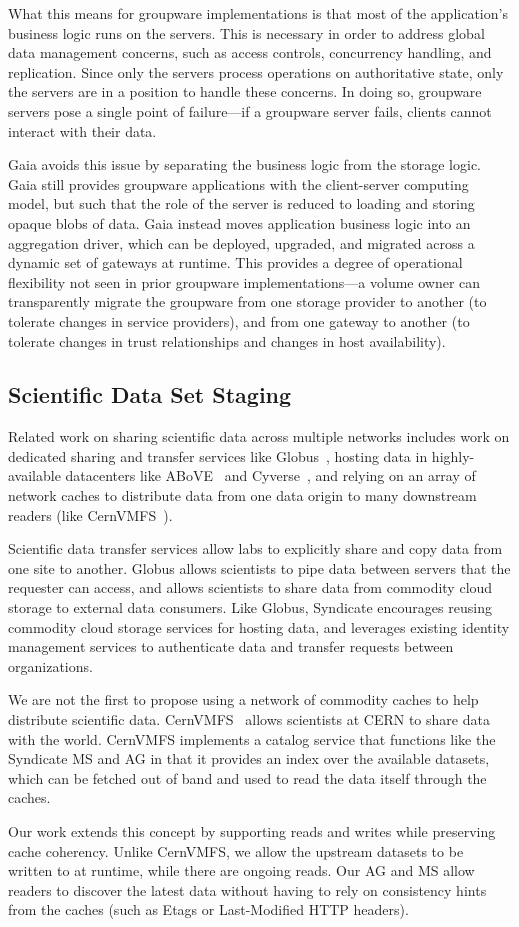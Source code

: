 What this means for groupware implementations is that most of the application's business logic runs on the
servers.  This is necessary in order to address global data management
concerns, such as access controls, concurrency handling, and
replication.  Since only the servers process operations on authoritative state, only
the servers are in a position to handle these concerns.  In doing so, groupware
servers pose a single point of failure---if a groupware server fails, clients
cannot interact with their data.

Gaia avoids this issue by separating the business logic from the storage logic.
Gaia still provides groupware applications with the client-server computing model,
but such that the role of the server is reduced to loading
and storing opaque blobs of data.  Gaia instead
moves application business logic into an aggregation driver, which can be
deployed, upgraded, and migrated across a dynamic set of gateways at runtime.
This provides a degree of operational flexibility not seen in prior groupware
implementations---a volume owner can transparently migrate the groupware from
one storage provider to another (to tolerate changes in service providers),
and from one gateway to another (to tolerate changes in trust relationships and
changes in host availability).

\subsection{Scientific Data Set Staging}

Related work on sharing scientific data across multiple networks includes
work on dedicated sharing and transfer services like Globus~\cite{globus},
hosting data in highly-available datacenters like ABoVE~\cite{nasa-above} and
Cyverse~\cite{cyverse}, and relying on an array of network caches to distribute
data from one data origin to many downstream readers (like
CernVMFS~\cite{cernvmfs}).

Scientific data transfer services allow labs to explicitly share and copy
data from one site to another.  Globus allows scientists to pipe data between
servers that the requester can access, and allows scientists to share data from
commodity cloud storage to external data consumers.  Like Globus, Syndicate
encourages reusing commodity cloud storage services for hosting data, and
leverages existing identity management services to authenticate data and
transfer requests between organizations.

We are not the first to propose using a network of commodity caches to help
distribute scientific data.  CernVMFS~\cite{cernvmfs} allows scientists at CERN
to share data with the world.  CernVMFS implements a catalog service that
functions like the Syndicate MS and AG in that it provides an index over the
available datasets, which can be fetched out of band and used to read the data
itself through the caches.

Our work extends this concept by supporting reads and writes while preserving
cache coherency.  Unlike CernVMFS, we allow the upstream datasets to be written
to at runtime, while there are ongoing reads.  Our AG and MS allow readers to
discover the latest data without having to rely on consistency hints from the
caches (such as Etags or Last-Modified HTTP headers).
